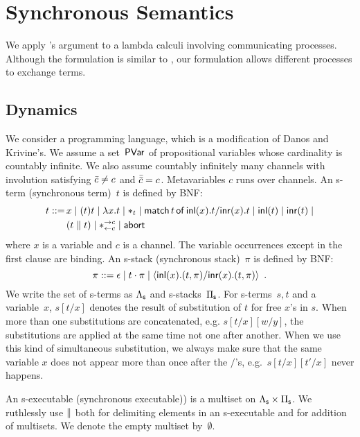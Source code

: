 \documentclass[envcountsame]{llncs}
\begin{document}
\section{Synchronous Semantics}
\label{sec:sync}

We apply \citet{danos-krivine}'s argument to a lambda calculi involving
communicating processes.  Although the formulation is similar to
\citep{danos-krivine}, our formulation allows different processes to
exchange terms.

\subsection{Dynamics}
We consider a programming language, which is a modification of
Danos and Krivine's.
We assume a set~$\mathsf{PVar}$ of propositional variables whose cardinality is
countably infinite.
We also assume countably infinitely many channels with involution
satisfying $\bar{c}\neq c$ and $\bar{\bar{c}} = c$.
Metavariables $c$ runs over channels.
An s-term (synchronous term)~$t$ is defined by BNF:
\begin{align*}
 t::= \,&x
 \mid (t)t
 \mid \lambda x.t
 \mid \ast_t
 \mid \mathsf{match}\,{t}\,\mathsf{of}\, \mathsf{inl}({x}). {t}/ \mathsf{inr}({x}). {t}
 \mid \mathsf{inl}({t})
 \mid \mathsf{inr}({t})
 \mid \\ &
 (t\parallel t)
 \mid \ast^{\rightarrow {c}}_{\leftarrow{c}}
 \mid \mathsf{abort\,}
\end{align*}
where $x$ is a variable and $c$ is a channel.  The variable occurrences
except in the first clause are binding.
An s-stack (synchronous stack)~$\pi$ is defined by BNF:
\[
 \pi ::= \epsilon
 \mid t\cdot \pi
 \mid \langle \mathsf{inl}({x}). ({t},{\pi})/ \mathsf{inr}({x}). ({t},{\pi})\rangle
 \enspace.
\]
We write the set of s-terms as $\Lambda_{\mathsf s}$ and s-stacks~$\Pi_{\mathsf s}$.
For s-terms~$s,t$ and a variable~$x$, $s[t/x]$ denotes the result of
substitution of $t$ for free $x$'s in $s$.  When more than one
substitutions are concatenated, e.g. $s[t/x][w/y]$, the substitutions
are applied at the same time not one after another.  When we use this
kind of simultaneous substitution, we always make sure that the same
variable $x$ does not appear more than once after the $/$'s,
e.g.~$s[t/x][t'/x]$ never happens.

An s-executable (synchronous executable))
is a multiset on $\Lambda_{\mathsf s}\times\Pi_{\mathsf s}$.
We ruthlessly use $\parallel$ both for delimiting elements in an
s-executable and for addition of multisets.
We denote the empty multiset by~$\emptyset$.
\end{document}
